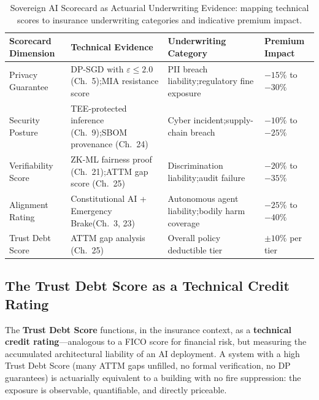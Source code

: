 \begin{table}[ht]
\centering
\caption{Sovereign AI Scorecard as Actuarial Underwriting Evidence: mapping technical scores to insurance underwriting categories and indicative premium impact.}
\label{tab:underwriting_evidence}
\renewcommand{\arraystretch}{1.4}
\begin{tabular}{p{2.9cm} p{3.6cm} p{3.6cm} p{2.2cm}}
\toprule
\textbf{Scorecard Dimension} & \textbf{Technical Evidence} & \textbf{Underwriting Category} & \textbf{Premium Impact} \\
\midrule
Privacy Guarantee &
DP-SGD with $\varepsilon \leq 2.0$ (Ch.~5);\newline MIA resistance score &
PII breach liability;\newline regulatory fine exposure &
$-15\%$ to $-30\%$ \\

Security Posture &
TEE-protected inference (Ch.~9);\newline SBOM provenance (Ch.~24) &
Cyber incident;\newline supply-chain breach &
$-10\%$ to $-25\%$ \\

Verifiability Score &
ZK-ML fairness proof (Ch.~21);\newline ATTM gap score (Ch.~25) &
Discrimination liability;\newline audit failure &
$-20\%$ to $-35\%$ \\

Alignment Rating &
Constitutional AI + Emergency Brake\newline (Ch.~3, 23) &
Autonomous agent liability;\newline bodily harm coverage &
$-25\%$ to $-40\%$ \\

Trust Debt Score &
ATTM gap analysis (Ch.~25) &
Overall policy deductible tier &
$\pm 10\%$ per tier \\
\bottomrule
\end{tabular}
\end{table}

\subsection{The Trust Debt Score as a Technical Credit Rating}
\label{sec:trust-debt-rating}

The \textbf{Trust Debt Score} functions, in the insurance context, as a \textbf{technical credit rating}---analogous to a FICO score for financial risk, but measuring the accumulated architectural liability of an AI deployment. A system with a high Trust Debt Score (many ATTM gaps unfilled, no formal verification, no DP guarantees) is actuarially equivalent to a building with no fire suppression: the exposure is observable, quantifiable, and directly priceable.

